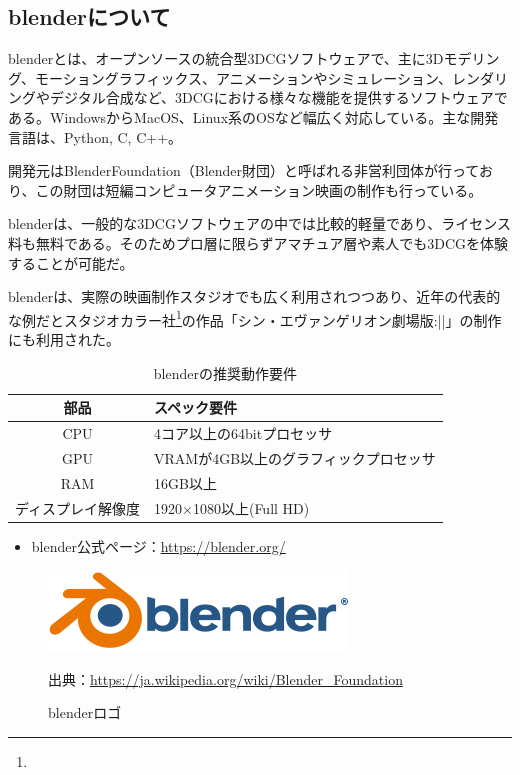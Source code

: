 \documentclass[dvipdfmx]{jsarticle}
\begin{document}
\subsection{blenderについて}
blenderとは、オープンソースの統合型3DCGソフトウェアで、主に3Dモデリング、モーショングラフィックス、アニメーションやシミュレーション、レンダリングやデジタル合成など、3DCGにおける様々な機能を提供するソフトウェアである。WindowsからMacOS、Linux系のOSなど幅広く対応している。主な開発言語は、Python, C, C++。\par
開発元はBlenderFoundation（Blender財団）と呼ばれる非営利団体が行っており、この財団は短編コンピュータアニメーション映画の制作も行っている。\par
blenderは、一般的な3DCGソフトウェアの中では比較的軽量であり、ライセンス料も無料である。そのためプロ層に限らずアマチュア層や素人でも3DCGを体験することが可能だ。\par
blenderは、実際の映画制作スタジオでも広く利用されつつあり、近年の代表的な例だとスタジオカラー社\footnote{}の作品「シン・エヴァンゲリオン劇場版:||」の制作にも利用された。
\begin{table}[H]
  \begin{center}
    \caption{blenderの推奨動作要件}
    \begin{tabular}{|c|l|} \hline
      部品&スペック要件\\ \hline
      CPU & 4コア以上の64bitプロセッサ \\
      GPU & VRAMが4GB以上のグラフィックプロセッサ \\
      RAM & 16GB以上 \\
      ディスプレイ解像度 & 1920$\times$1080以上(Full HD)\\ \hline
    \end{tabular}
    \label{hyo01}
  \end{center}
\end{table}
\begin{itemize}
  \item blender公式ページ：\url{https://blender.org/}
\end{itemize}
\begin{figure}[H]
  \centering
  \includegraphics[scale=0.4]{images/Logo_Blender.svg.png}
  \caption{blenderロゴ}
  出典：\url{https://ja.wikipedia.org/wiki/Blender_Foundation}
\end{figure}
\end{document}
